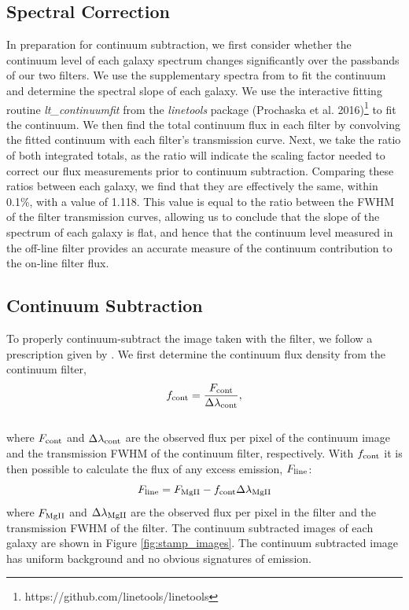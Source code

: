 \documentclass[twocolumn]{aastex61}
\begin{document}
\subsection{Spectral Correction}
In preparation for continuum subtraction, we first consider whether the continuum level of each galaxy spectrum changes significantly over the passbands of our two filters.
We use the supplementary spectra from \citet{Rubin_2014} to fit the continuum and determine the spectral slope of each galaxy. We use the interactive fitting routine \emph{lt\_continuumfit} from the \emph{linetools} package (Prochaska et al. 2016)\footnote{https://github.com/linetools/linetools}\nocite{Prochaska2016} to fit the continuum. We then find the total continuum flux in each filter by convolving the fitted continuum with each filter's transmission curve. Next, we take the ratio of both integrated totals, as the ratio will indicate the scaling factor needed to correct our flux measurements prior to continuum subtraction. Comparing these ratios between each galaxy, we find that they are effectively the same, within 0.1\%, with a value of 1.118. This value is equal to the ratio between the FWHM of the filter transmission curves, allowing us to conclude that the slope of the spectrum of each galaxy is flat, and hence that the continuum level measured in the off-line filter provides an accurate measure of the continuum contribution to the on-line filter flux.

\subsection{Continuum Subtraction}\label{subsec.cont_sub}

To properly continuum-subtract the image taken with the  filter, we follow a prescription given by \cite{Battaia_2015}. 
We first determine the continuum flux density from the continuum filter,
\begin{equation}
f_{\rm{cont}}=\frac{F_{\rm{cont}}}{\Delta \lambda_{\rm{cont}}},
\end{equation}\\
where $F_{\rm{cont}}$ and $\Delta \lambda_{\rm{cont}}$ are the observed flux per pixel of the continuum image and the transmission FWHM of the continuum filter, respectively. With $f_{\rm cont}$ it is then possible to calculate the flux of any excess emission, $F_{\rm{line}}$:
\begin{equation}
F_{\rm{line}}=F_{\rm{MgII}}-f_{\rm{cont}} \Delta \lambda_{\rm{MgII}}
\label{eq:subtraction}
\end{equation}
where $F_{\rm{MgII}}$ and $\Delta \lambda_{\rm MgII}$ are the observed flux per pixel in the  filter and the transmission FWHM of the  filter. The continuum subtracted images of each galaxy are shown in Figure \ref{fig:stamp_images}. The continuum subtracted image has uniform background and no obvious signatures of emission.
\end{document}
